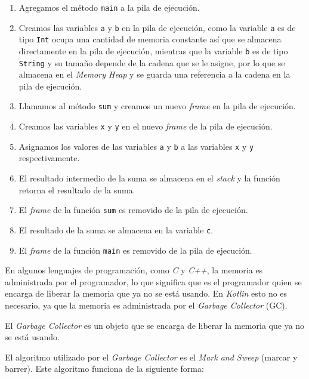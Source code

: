   \begin{enumerate}
    \item Agregamos el método \texttt{main} a la pila de ejecución.
    \item Creamos las variables \texttt{a} y \texttt{b} en la pila de ejecución, como la variable 
      \texttt{a} es de tipo \texttt{Int} ocupa una cantidad de memoria constante así que se almacena 
      directamente en la pila de ejecución, mientras que la variable \texttt{b} es de tipo
      \texttt{String} y su tamaño depende de la cadena que se le asigne, por lo que se almacena en el
      \textit{Memory Heap} y se guarda una referencia a la cadena en la pila de ejecución.
    \item Llamamos al método \texttt{sum} y creamos un nuevo \textit{frame} en la pila de 
      ejecución.
    \item Creamos las variables \texttt{x} y \texttt{y} en el nuevo \textit{frame} de la pila de 
      ejecución.
    \item Asignamos los valores de las variables \texttt{a} y \texttt{b} a las variables
      \texttt{x} y \texttt{y} respectivamente.
    \item El resultado intermedio de la suma se almacena en el \textit{stack} y la función retorna
      el resultado de la suma.
    \item El \textit{frame} de la función \texttt{sum} es removido de la pila de ejecución.
    \item El resultado de la suma se almacena en la variable \texttt{c}.
    \item El \textit{frame} de la función \texttt{main} es removido de la pila de ejecución.
  \end{enumerate}

  En algunos lenguajes de programación, como \textit{C} y \textit{C++}, la memoria es administrada
  por el programador, lo que significa que es el programador quien se encarga de liberar la memoria
  que ya no se está usando.
  En \textit{Kotlin} esto no es necesario, ya que la memoria es administrada por el \textit{Garbage
  Collector} (GC).

  \begin{defaultbox}
    El \textit{Garbage Collector} es un objeto que se encarga de liberar la memoria que ya no se
    está usando.
  \end{defaultbox}

  El algoritmo utilizado por el \textit{Garbage Collector} es el \textit{Mark and Sweep} (marcar y
  barrer).
  Este algoritmo funciona de la siguiente forma:

